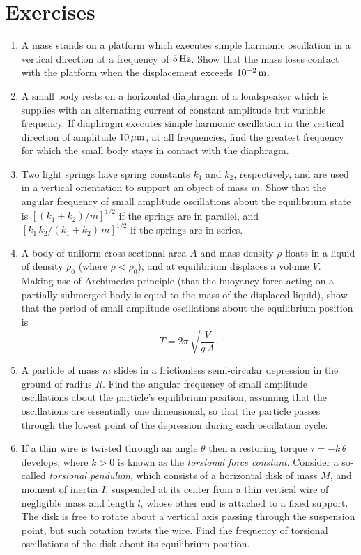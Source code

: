 \section{Exercises}
{\small
\begin{enumerate}

\item A mass stands on a platform which executes simple harmonic oscillation in a vertical
direction at a frequency of $5\,{\rm Hz}$. Show that the mass loses contact with the platform
when the displacement exceeds $10^{-2}\,{\rm m}$. 

\item A small body rests on a horizontal diaphragm of a loudspeaker
which is supplies with an alternating current of constant amplitude but variable
frequency. If diaphragm executes simple harmonic oscillation in the vertical
direction of amplitude $10\,\mu{\rm m}$, at all frequencies, find the greatest
frequency for which the small body stays in contact with the diaphragm. 

\item Two light springs have spring constants $k_1$ and $k_2$, respectively, and are used in a vertical
orientation to support an object of mass $m$. Show that the angular frequency of small amplitude oscillations about the equilibrium state
is $[(k_1+k_2)/m]^{1/2}$ if the springs are in parallel, and $[k_1\,k_2/(k_1+k_2)\,m]^{1/2}$
if the springs are in series.

\item A body of uniform cross-sectional area $A$ and mass density $\rho$ floats in a liquid
of density $\rho_0$ (where $\rho<\rho_0$), and at equilibrium displaces a volume $V$. Making use of Archimedes principle (that the buoyancy force acting on a partially
submerged body is equal to the mass of the displaced liquid), show
that the period of small amplitude oscillations about the equilibrium position is
$$
T = 2\pi\,\sqrt{\frac{V}{g\,A}}.
$$

\item A particle of mass $m$ slides in a frictionless semi-circular depression in the
ground
of radius $R$. Find the angular frequency of small amplitude oscillations
about the particle's equilibrium position, assuming that the oscillations
are essentially one dimensional, so that the particle  passes through
the lowest point of the depression during each oscillation cycle.

\item If a thin wire is twisted through an angle $\theta$ then a restoring
torque $\tau = - k\,\theta$ develops, where $k>0$ is known as the {\em torsional
force constant}. Consider a so-called {\em torsional pendulum},
which consists of a horizontal disk of mass $M$, and moment of inertia $I$, suspended at its
center from a thin vertical wire of negligible mass and length $l$, whose other end is attached to a fixed
support. The disk is free to rotate about a vertical axis passing through the suspension point, but such rotation twists the wire. Find the frequency of torsional oscillations of the disk about its
equilibrium position.


\end{enumerate}}
